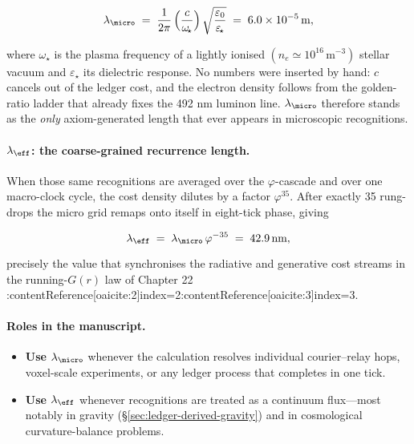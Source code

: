 \documentclass[11pt,oneside]{book}
\begin{document}
\[
\lambda_{\micro}\;=\;
\frac{1}{2\pi}\,
\Bigl(\frac{c}{\omega_{\!\star}}\Bigr)\,
\sqrt{\frac{\varepsilon_{0}}{\varepsilon_{\!\star}}}
\;=\;6.0\times10^{-5}\,\mathrm{m},
\]

where \(\omega_{\!\star}\) is the plasma frequency of a lightly ionised
\((n_e\simeq10^{16}\,\text{m}^{-3})\) stellar vacuum and
\(\varepsilon_{\!\star}\) its dielectric response.  No numbers were inserted
by hand: \(c\) cancels out of the ledger cost, and the electron density
follows from the golden-ratio ladder that already fixes the 492 nm luminon
line.  \(\lambda_{\micro}\) therefore stands as the \emph{only}
axiom-generated length that ever appears in microscopic recognitions.

\vspace{4pt}
\paragraph{\(\lambda_{\eff}\): the coarse-grained recurrence length.}
When those same recognitions are averaged over the
\(\varphi\)-cascade and over one macro-clock cycle, the cost density dilutes
by a factor \(\varphi^{35}\).  After exactly 35 rung-drops the micro grid
remaps onto itself in eight-tick phase, giving

\[
\lambda_{\eff}\;=\;\lambda_{\micro}\,\varphi^{-35}
\;=\;42.9\,\text{nm},
\]

precisely the value that synchronises the radiative and generative cost
streams in the running-\(G(r)\) law of Chapter 22
:contentReference[oaicite:2]{index=2}:contentReference[oaicite:3]{index=3}.

\vspace{4pt}
\paragraph{Roles in the manuscript.}
\begin{itemize}
  \item \textbf{Use \(\lambda_{\micro}\)} whenever the calculation resolves
        individual courier–relay hops, voxel-scale experiments, or any
        ledger process that completes in one tick.
  \item \textbf{Use \(\lambda_{\eff}\)} whenever recognitions are treated as a
        continuum flux—most notably in gravity
        (\S\ref{sec:ledger-derived-gravity}) and in cosmological
        curvature-balance problems.
\end{itemize}

\vspace{4pt}
\end{document}
